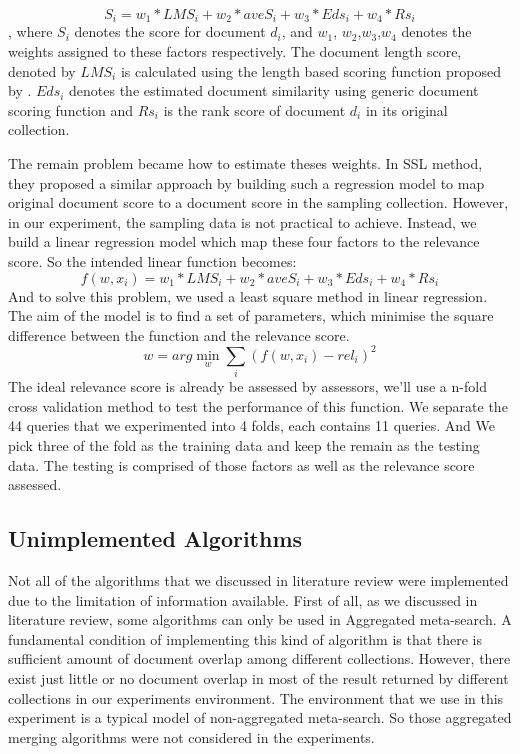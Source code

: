 \begin{equation}
\label{eq:mul_col}
S_i=w_1*LMS_i+w_2*aveS_i+w_3*Eds_i+w_4*Rs_i
\end{equation}
, where $S_i$ denotes the score for document $d_i$, and {$w_1$, $w_2$,$w_3$,$w_4$} denotes the weights assigned to these factors respectively. The document length score, denoted by $LMS_i$ is calculated using the length based scoring function proposed by \cite{Rasolofo2001}. $Eds_i$ denotes the estimated document similarity using generic document scoring function and $Rs_i$ is the rank score of document $d_i$ in its original collection.

The remain problem became how to estimate theses weights. In SSL method\cite{Si2003a}, they proposed a similar approach by building such a regression model to map original document score to a document score in the sampling collection. However, in our experiment, the sampling data is not practical to achieve. Instead, we build a linear regression model which map these four factors to the relevance score. So the intended linear function becomes:
\begin{equation}
\label{eq:regression}
f(w,x_i)=w_1*LMS_i+w_2*aveS_i+w_3*Eds_i+w_4*Rs_i
\end{equation}
And to solve this problem, we used a least square method in linear regression. The aim of the model is to find a set of parameters, which minimise the square difference between the function and the relevance score.
\begin{equation}
\label{eq:leastsquare}
w=arg \min\limits_w{\sum\limits_{i}(f(w,x_i)-rel_i)^2}
\end{equation}
The ideal relevance score is already be assessed by assessors, we'll use a n-fold cross validation method to test the performance of this function. We separate the 44 queries that we experimented into 4 folds, each contains 11 queries. And We pick three of the fold as the training data and keep the remain as the testing data. The testing is comprised of those factors as well as the relevance score assessed.


\subsection{Unimplemented Algorithms}

Not all of the algorithms that we discussed in literature review were implemented due to the limitation of information available. First of all, as we discussed in literature review, some algorithms can only be used in Aggregated meta-search. A fundamental condition of implementing this kind of algorithm is that there is sufficient amount of document overlap among different collections. However, there exist just little or no document overlap in most of the result returned by different collections in our experiments environment. The environment that we use in this experiment is a typical model of non-aggregated meta-search. So those aggregated merging algorithms were not considered in the experiments.
  

